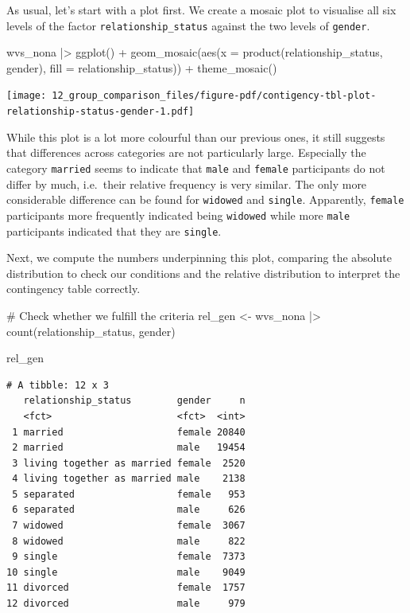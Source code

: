 \documentclass[
  letterpaper,
]{krantz}
\makeatletter
\newenvironment{Shaded}{\begin{snugshade}}{\end{snugshade}}
\newcommand{\AttributeTok}[1]{\textcolor[rgb]{0.40,0.45,0.13}{#1}}
\newcommand{\CommentTok}[1]{\textcolor[rgb]{0.37,0.37,0.37}{#1}}
\newcommand{\FunctionTok}[1]{\textcolor[rgb]{0.28,0.35,0.67}{#1}}
\newcommand{\NormalTok}[1]{\textcolor[rgb]{0.00,0.23,0.31}{#1}}
\newcommand{\OtherTok}[1]{\textcolor[rgb]{0.00,0.23,0.31}{#1}}
\newcommand{\SpecialCharTok}[1]{\textcolor[rgb]{0.37,0.37,0.37}{#1}}
\newenvironment{kframe}{%
\medskip{}
\setlength{\fboxsep}{.8em}
 \def\at@end@of@kframe{}%
 \ifinner\ifhmode%
  \def\at@end@of@kframe{\end{minipage}}%
  \begin{minipage}{\columnwidth}%
 \fi\fi%
 \def\FrameCommand##1{\hskip\@totalleftmargin \hskip-\fboxsep
 \colorbox{shadecolor}{##1}\hskip-\fboxsep
     \hskip-\linewidth \hskip-\@totalleftmargin \hskip\columnwidth}%
 \MakeFramed {\advance\hsize-\width
   \@totalleftmargin\z@ \linewidth\hsize
   \@setminipage}}%
 {\par\unskip\endMakeFramed%
 \at@end@of@kframe}
\renewenvironment{Shaded}{\begin{kframe}}{\end{kframe}}
\makeatother
\begin{document}
As usual, let's start with a plot first. We create a mosaic plot to
visualise all six levels of the factor \texttt{relationship\_status}
against the two levels of \texttt{gender}.

\begin{Shaded}
\begin{Highlighting}[]
\NormalTok{wvs\_nona }\SpecialCharTok{|\textgreater{}}
  \FunctionTok{ggplot}\NormalTok{() }\SpecialCharTok{+}
  \FunctionTok{geom\_mosaic}\NormalTok{(}\FunctionTok{aes}\NormalTok{(}\AttributeTok{x =} \FunctionTok{product}\NormalTok{(relationship\_status, gender),}
                  \AttributeTok{fill =}\NormalTok{ relationship\_status)) }\SpecialCharTok{+}
  \FunctionTok{theme\_mosaic}\NormalTok{()}
\end{Highlighting}
\end{Shaded}

\texttt{[image: 12\_group\_comparison\_files/figure-pdf/contigency-tbl-plot-relationship-status-gender-1.pdf]}

While this plot is a lot more colourful than our previous ones, it still
suggests that differences across categories are not particularly large.
Especially the category \texttt{married} seems to indicate that
\texttt{male} and \texttt{female} participants do not differ by much,
i.e.~their relative frequency is very similar. The only more
considerable difference can be found for \texttt{widowed} and
\texttt{single}. Apparently, \texttt{female} participants more
frequently indicated being \texttt{widowed} while more \texttt{male}
participants indicated that they are \texttt{single}.

Next, we compute the numbers underpinning this plot, comparing the
absolute distribution to check our conditions and the relative
distribution to interpret the contingency table correctly.

\begin{Shaded}
\begin{Highlighting}[]
\CommentTok{\# Check whether we fulfill the criteria}
\NormalTok{rel\_gen }\OtherTok{\textless{}{-}}
\NormalTok{  wvs\_nona }\SpecialCharTok{|\textgreater{}}
  \FunctionTok{count}\NormalTok{(relationship\_status, gender)}

\NormalTok{rel\_gen}
\end{Highlighting}
\end{Shaded}

\begin{verbatim}
# A tibble: 12 x 3
   relationship_status        gender     n
   <fct>                      <fct>  <int>
 1 married                    female 20840
 2 married                    male   19454
 3 living together as married female  2520
 4 living together as married male    2138
 5 separated                  female   953
 6 separated                  male     626
 7 widowed                    female  3067
 8 widowed                    male     822
 9 single                     female  7373
10 single                     male    9049
11 divorced                   female  1757
12 divorced                   male     979
\end{verbatim}
\end{document}
